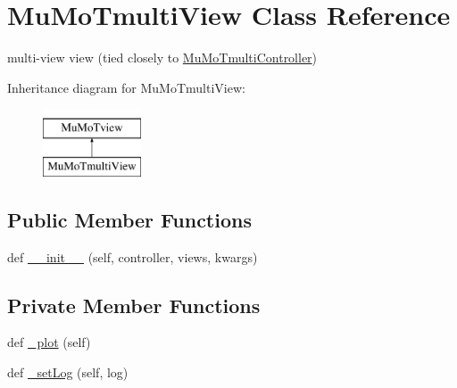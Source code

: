 \hypertarget{class_mu_mo_t_1_1_mu_mo_tmulti_view}{}\section{Mu\+Mo\+Tmulti\+View Class Reference}
\label{class_mu_mo_t_1_1_mu_mo_tmulti_view}


multi-\/view view (tied closely to \hyperlink{class_mu_mo_t_1_1_mu_mo_tmulti_controller}{Mu\+Mo\+Tmulti\+Controller})  


Inheritance diagram for Mu\+Mo\+Tmulti\+View\+:\begin{figure}[H]
\begin{center}
\leavevmode
\includegraphics[height=2.000000cm]{class_mu_mo_t_1_1_mu_mo_tmulti_view}
\end{center}
\end{figure}
\subsection*{Public Member Functions}
\begin{DoxyCompactItemize}
\item 
def \hyperlink{class_mu_mo_t_1_1_mu_mo_tmulti_view_abf80dedbd77821fd7d069315a0bf3f92}{\+\_\+\+\_\+init\+\_\+\+\_\+} (self, controller, views, kwargs)
\end{DoxyCompactItemize}
\subsection*{Private Member Functions}
\begin{DoxyCompactItemize}
\item 
def \hyperlink{class_mu_mo_t_1_1_mu_mo_tmulti_view_aaff21bb2a6ebdaed50f2f2fb67d0bf5c}{\+\_\+plot} (self)
\item 
def \hyperlink{class_mu_mo_t_1_1_mu_mo_tmulti_view_abfc1e19ed53c088799d1f499bc010f7f}{\+\_\+set\+Log} (self, log)
\end{DoxyCompactItemize}
